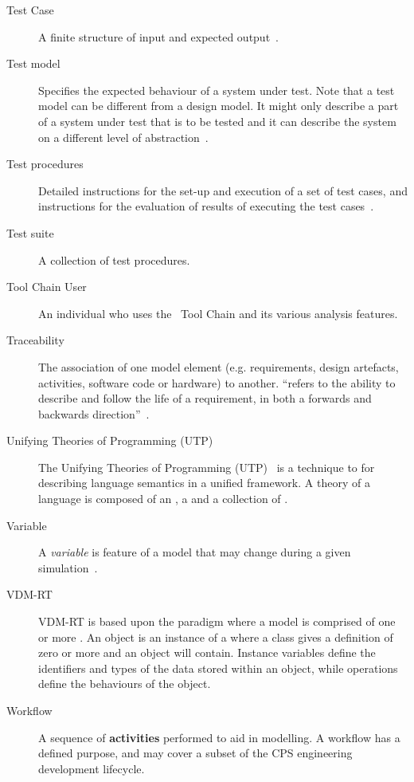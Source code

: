 \begin{description}
\item[Test Case] A finite structure of input and expected output~\cite{Utting&06}.

\item[Test model] Specifies the expected behaviour of a system under test. Note that a test model can be different from a design model. It might only describe a part of a system under test that is to be tested and it can describe the system on a different level of abstraction~\cite{Coleman&13b}.

\item[Test procedures] Detailed instructions for the set-up and execution of a set of test cases, and instructions for the evaluation of results of executing the test cases~\cite{DO178B, Coleman&13b}.

\item[Test suite] A collection of test procedures.

\item[Tool Chain User] An individual who uses the \into\ Tool Chain and its various analysis features.

\item[Traceability] The association of one model element (e.g. requirements, design artefacts, activities, software code or hardware) to another.  ``refers to the ability to describe and follow the life of a requirement, in both a forwards and backwards direction''~\cite{Gotel&94}.

\item[Unifying Theories of Programming (UTP)]  The Unifying Theories of Programming (UTP)~ \cite{Hoare&98} is a technique to for describing language semantics in a unified framework. A theory of a language is composed of an , a  and a collection of .

\item[Variable] A \emph{variable} is feature of a model that may change during a given simulation~\cite{Broenink&12b}.

\item[VDM-RT] VDM-RT is based upon the  paradigm where a model is comprised of one or more . An object is an instance of a  where a class gives a definition of zero or more  and  an object will contain. Instance variables define the identifiers and types of the data stored within an object, while operations define the behaviours of the object.

\item[Workflow] A sequence of \textbf{activities} performed to aid in modelling. A workflow has a defined purpose, and may cover a subset of the CPS engineering development lifecycle.

\end{description} 